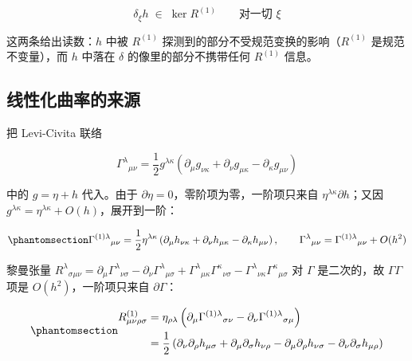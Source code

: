 \documentclass[
  chinese,
  a4paper,
  UTF8,
  12pt,
  oneside,
  openany]{ctexbook}
\theoremstyle{plain}
\theoremstyle{plain}
\theoremstyle{plain}
\theoremstyle{definition}
\theoremstyle{plain}
\theoremstyle{plain}
\theoremstyle{remark}
\begin{document}
\[
\delta_{\xi}h\;\in\;\ker R^{(1)}
\qquad\text{对一切 }\xi
\]

这两条给出读数：\(h\) 中被 \(R^{(1)}\)
探测到的部分不受规范变换的影响（\(R^{(1)}\) 是规范不变量），而 \(h\)
中落在 \(\delta\) 的像里的部分不携带任何 \(R^{(1)}\) 信息。

\subsection{线性化曲率的来源}\label{ux7ebfux6027ux5316ux66f2ux7387ux7684ux6765ux6e90}

把 Levi-Civita 联络

\[
\Gamma^{\lambda}{}_{\mu\nu}=\frac{1}{2}g^{\lambda\kappa}\left(\partial_{\mu}g_{\nu\kappa}+\partial_{\nu}g_{\mu\kappa}-\partial_{\kappa}g_{\mu\nu}\right)
\]

中的 \(g=\eta+h\) 代入。由于
\(\partial\eta=0\)，零阶项为零，一阶项只来自
\(\eta^{\lambda\kappa}\partial h\)；又因
\(g^{\lambda\kappa}=\eta^{\lambda\kappa}+O(h)\)，展开到一阶：

\begin{equation}\protect\phantomsection\label{eq-lin-christoffel}{
\Gamma^{(1)\lambda}{}_{\mu\nu}
=\frac{1}{2}\eta^{\lambda\kappa}\left(\partial_{\mu}h_{\nu\kappa}+\partial_{\nu}h_{\mu\kappa}-\partial_{\kappa}h_{\mu\nu}\right),
\qquad
\Gamma^{\lambda}{}_{\mu\nu}=\Gamma^{(1)\lambda}{}_{\mu\nu}+O(h^{2})
}\end{equation}

黎曼张量
\(R^{\lambda}{}_{\sigma\mu\nu}=\partial_{\mu}\Gamma^{\lambda}{}_{\nu\sigma}-\partial_{\nu}\Gamma^{\lambda}{}_{\mu\sigma}+\Gamma^{\lambda}{}_{\mu\kappa}\Gamma^{\kappa}{}_{\nu\sigma}-\Gamma^{\lambda}{}_{\nu\kappa}\Gamma^{\kappa}{}_{\mu\sigma}\)
对 \(\Gamma\) 是二次的，故 \(\Gamma\Gamma\) 项是
\(O(h^{2})\)，一阶项只来自 \(\partial\Gamma\)：

\begin{equation}\protect\phantomsection\label{eq-lin-riemann}{
\begin{aligned}
R^{(1)}_{\mu\nu\rho\sigma}
&=\eta_{\rho\lambda}\left(\partial_{\mu}\Gamma^{(1)\lambda}{}_{\sigma\nu}-\partial_{\nu}\Gamma^{(1)\lambda}{}_{\sigma\mu}\right)\\
&=\frac{1}{2}\left(\partial_{\nu}\partial_{\rho}h_{\mu\sigma}+\partial_{\mu}\partial_{\sigma}h_{\nu\rho}-\partial_{\mu}\partial_{\rho}h_{\nu\sigma}-\partial_{\nu}\partial_{\sigma}h_{\mu\rho}\right)
\end{aligned}
}\end{equation}
\end{document}
